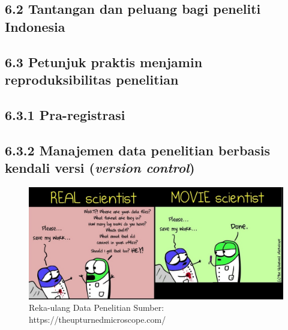 \documentclass[
  english,
  man]{apa6}
\begin{document}
\hypertarget{tantangan-dan-peluang-bagi-peneliti-indonesia}{%
\subsection{6.2 Tantangan dan peluang bagi peneliti Indonesia}\label{tantangan-dan-peluang-bagi-peneliti-indonesia}}

\hypertarget{petunjuk-praktis-menjamin-reproduksibilitas-penelitian}{%
\subsection{6.3 Petunjuk praktis menjamin reproduksibilitas penelitian}\label{petunjuk-praktis-menjamin-reproduksibilitas-penelitian}}

\hypertarget{pra-registrasi}{%
\subsection{6.3.1 Pra-registrasi}\label{pra-registrasi}}

\hypertarget{manajemen-data-penelitian-berbasis-kendali-versi-version-control}{%
\subsection{\texorpdfstring{6.3.2 Manajemen data penelitian berbasis kendali versi (\emph{version control})}{6.3.2 Manajemen data penelitian berbasis kendali versi (version control)}}\label{manajemen-data-penelitian-berbasis-kendali-versi-version-control}}

\begin{figure}

{\centering \includegraphics[width=12.02in]{images/data-sharing} 

}

\caption{Reka-ulang Data Penelitian Sumber: https://theupturnedmicroscope.com/}\label{fig:unnamed-chunk-4}
\end{figure}
\end{document}
